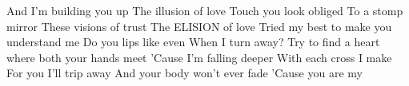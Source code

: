 


And I'm building you up
The illusion of love
Touch you look obliged
To a stomp mirror
These visions of trust
The ELISION of love
Tried my best to make you understand me
Do you lips like even
When I turn away?
Try to find a heart where both your hands meet
'Cause I'm falling deeper
With each cross I make
For you I'll trip away
And your body won't ever fade
'Cause you are my

%



%
